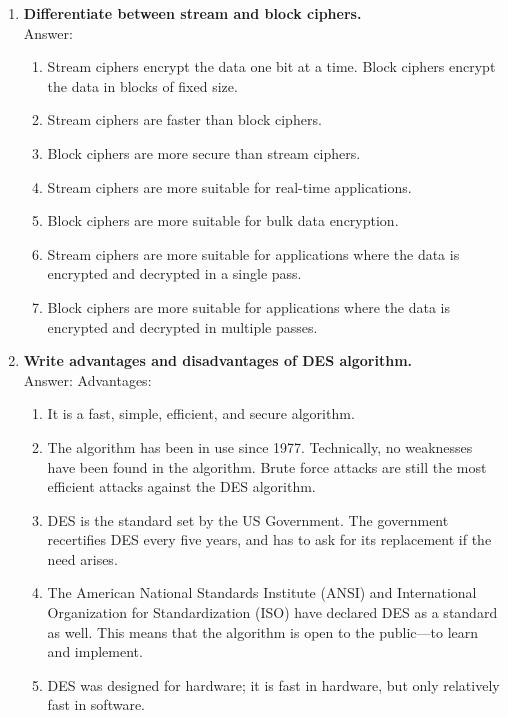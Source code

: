 \documentclass[11pt]{article}
\begin{document}
\begin{enumerate}
	\item \textbf{Differentiate between stream and block ciphers.}\\
	      Answer:
	      \begin{enumerate}
		      \item Stream ciphers encrypt the data one bit at a time. Block ciphers encrypt the data in blocks of fixed size.
		      \item Stream ciphers are faster than block ciphers.
		      \item Block ciphers are more secure than stream ciphers.
		      \item Stream ciphers are more suitable for real-time applications.
		      \item Block ciphers are more suitable for bulk data encryption.
		      \item Stream ciphers are more suitable for applications where the data is encrypted and decrypted in a single pass.
		      \item Block ciphers are more suitable for applications where the data is encrypted and decrypted in multiple passes.
	      \end{enumerate}

	\item \textbf{Write advantages and disadvantages of DES algorithm.}\\
	      Answer:
	      Advantages:
	      \begin{enumerate}
		      \item It is a fast, simple, efficient, and secure algorithm.
		      \item The algorithm has been in use since 1977. Technically, no weaknesses have been found in the algorithm. Brute force attacks are still the most efficient attacks against the DES algorithm.
		      \item DES is the standard set by the US Government. The government recertifies DES every five years, and has to ask for its replacement if the need arises.
		      \item The American National Standards Institute (ANSI) and International Organization for Standardization (ISO) have declared DES as a standard as well. This means that the algorithm is open to the public—to learn and implement.
		      \item DES was designed for hardware; it is fast in hardware, but only relatively fast in software.
	      \end{enumerate}


\end{enumerate}
\end{document}
